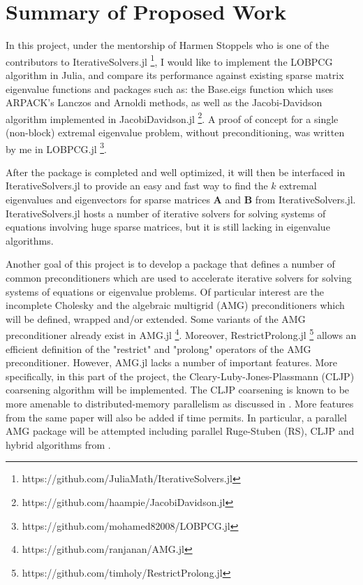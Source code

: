 \documentclass[12pt]{article}
\begin{document}
\section{Summary of Proposed Work}

In this project, under the mentorship of Harmen Stoppels who is one of the contributors to IterativeSolvers.jl \footnote{https://github.com/JuliaMath/IterativeSolvers.jl}, I would like to implement the LOBPCG algorithm in Julia, and compare its performance against existing sparse matrix eigenvalue functions and packages such as: the Base.eigs function which uses ARPACK's Lanczos and Arnoldi methods, as well as the Jacobi-Davidson algorithm implemented in JacobiDavidson.jl \footnote{https://github.com/haampie/JacobiDavidson.jl}. A proof of concept for a single (non-block) extremal eigenvalue problem, without preconditioning, was written by me in LOBPCG.jl \footnote{https://github.com/mohamed82008/LOBPCG.jl}.

After the package is completed and well optimized, it will then be interfaced in IterativeSolvers.jl to provide an easy and fast way to find the $k$ extremal eigenvalues and eigenvectors for sparse matrices $\bm{A}$ and $\bm{B}$ from IterativeSolvers.jl. IterativeSolvers.jl hosts a number of iterative solvers for solving systems of equations involving huge sparse matrices, but it is still lacking in eigenvalue algorithms.

Another goal of this project is to develop a package that defines a number of common preconditioners which are used to accelerate iterative solvers for solving systems of equations or eigenvalue problems. Of particular interest are the incomplete Cholesky and the algebraic multigrid (AMG) preconditioners which will be defined, wrapped and/or extended. Some variants of the AMG preconditioner already exist in AMG.jl \footnote{https://github.com/ranjanan/AMG.jl}. Moreover, RestrictProlong.jl \footnote{https://github.com/timholy/RestrictProlong.jl} allows an efficient definition of the "restrict" and "prolong" operators of the AMG preconditioner. However, AMG.jl lacks a number of important features. More specifically, in this part of the project, the Cleary-Luby-Jones-Plassmann (CLJP) coarsening algorithm will be implemented. The CLJP coarsening is known to be more amenable to distributed-memory parallelism as discussed in \cite{Henson2002}. More features from the same paper will also be added if time permits. In particular, a parallel AMG package will be attempted including parallel Ruge-Stuben (RS), CLJP and hybrid algorithms from \cite{Henson2002}.
\end{document}
